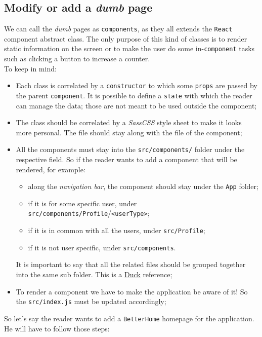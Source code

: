 \subsection{Modify or add a \emph{dumb} page}
We can call the \emph{dumb} pages as \verb|components|, as they all extends the \verb|React| component abstract class. The only purpose of this kind of classes is to render static information on the screen or to make the user do some in-\verb|component| tasks such as clicking a button to increase a counter.
\\To keep in mind: 
\begin{itemize}
	\item Each class is correlated by a \verb|constructor| to which some \verb|props| are passed by the parent \verb|component|. It is possible to define a \verb|state| with which the reader can manage the data; those are not meant to be used outside the component;
	\item The class should be correlated by a \emph{SassCSS} style sheet to make it looks more personal. The file should stay along with the file of the component;
	\item All the components must stay into the \verb|src/components/| folder under the respective field. So if the reader wants to add a component that will be rendered, for example:
	\begin{itemize}
		\item along the \emph{navigation bar}, the component should stay under the \verb|App| folder;
		\item if it is for some specific user, under \verb|src/components/Profile|/\verb|<userType>|;
		\item if it is in common with all the users, under \verb|src/Profile|;
		\item if it is not user specific, under \verb|src/components|.
	\end{itemize}  
	It is important to say that all the related files should be grouped together into the same sub folder. This is a \href{https://medium.freecodecamp.org/scaling-your-redux-app-with-ducks-6115955638be}{Duck} reference;
	\item To render a component we have to make the application be aware of it! So the \verb|src/index.js| must be updated accordingly;
\end{itemize}
So let's say the reader wants to add a \verb|BetterHome| homepage for the application. He will have to follow those steps:
